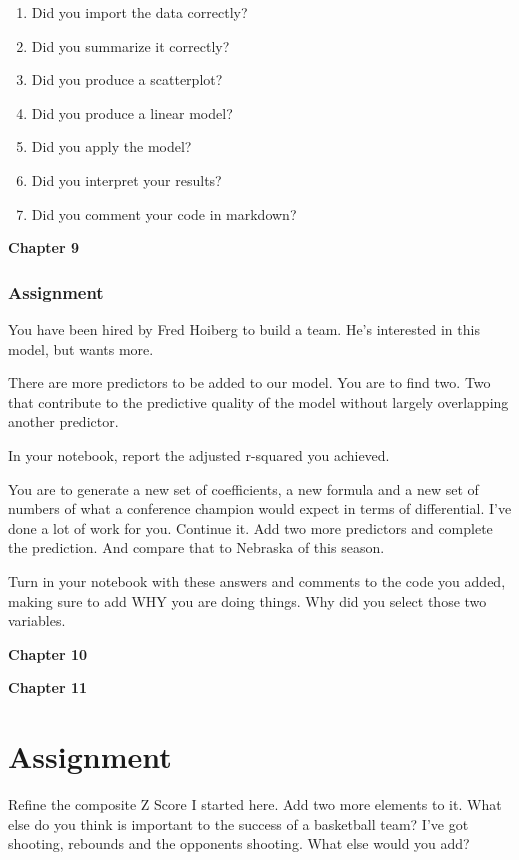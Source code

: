 \documentclass[]{book}
\providecommand{\tightlist}{%
  \setlength{\itemsep}{0pt}\setlength{\parskip}{0pt}}
\begin{document}
\begin{enumerate}
\def\labelenumi{\arabic{enumi}.}
\tightlist
\item
  Did you import the data correctly?
\item
  Did you summarize it correctly?
\item
  Did you produce a scatterplot?
\item
  Did you produce a linear model?
\item
  Did you apply the model?
\item
  Did you interpret your results?
\item
  Did you comment your code in markdown?
\end{enumerate}

\textbf{Chapter 9}

\subsubsection{Assignment}\label{assignment-3}

You have been hired by Fred Hoiberg to build a team. He's interested in
this model, but wants more.

There are more predictors to be added to our model. You are to find two.
Two that contribute to the predictive quality of the model without
largely overlapping another predictor.

In your notebook, report the adjusted r-squared you achieved.

You are to generate a new set of coefficients, a new formula and a new
set of numbers of what a conference champion would expect in terms of
differential. I've done a lot of work for you. Continue it. Add two more
predictors and complete the prediction. And compare that to Nebraska of
this season.

Turn in your notebook with these answers and comments to the code you
added, making sure to add WHY you are doing things. Why did you select
those two variables.

\textbf{Chapter 10}

\textbf{Chapter 11}

\section{Assignment}\label{assignment-4}

Refine the composite Z Score I started here. Add two more elements to
it. What else do you think is important to the success of a basketball
team? I've got shooting, rebounds and the opponents shooting. What else
would you add?
\end{document}

